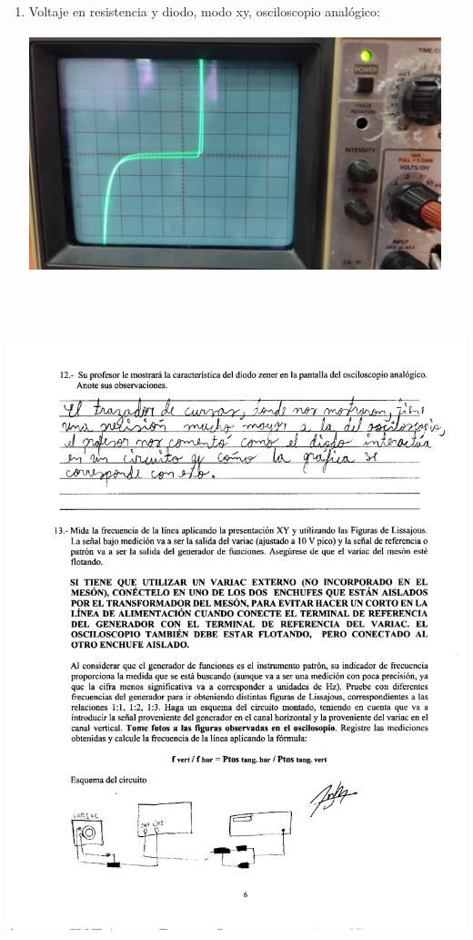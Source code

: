 \documentclass[12pt]{article}
\begin{document}
\begin{enumerate}
		\item Voltaje en resistencia y diodo, modo xy, osciloscopio analógico:
		
		\includegraphics[width=12cm,height=7cm]{Img/lab_5_img_10}
		 
	\end{enumerate}	
	
	\begin{center}
		\includegraphics[width=16cm,height=20cm]{Img/anexo_0004}
	\end{center}
	
\end{document}
